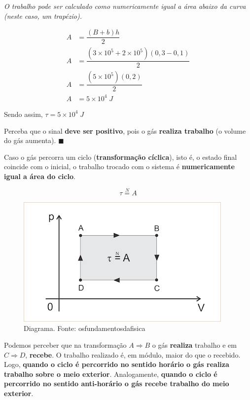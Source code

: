 \documentclass[12pt]{article}
\newenvironment{resposta*}
{\bf Resposta:\\ }
{}
\begin{document}
\begin{resposta*}
{\it O trabalho pode ser calculado como numericamente igual a área abaixo da curva (neste caso, um trapézio).

\begin{align*}
    A &= \dfrac{(B+b)h}{2}\\
    A &= \dfrac{(3\times 10^{5}+2\times 10^{5})(0,3-0,1)}{2}\\
    A &= \dfrac{(5\times 10^{5})(0,2)}{2}\\
    A &= 5\times 10^{4}\;J
\end{align*}

Sendo assim, $\boxed{\tau = 5\times 10^{4}\;J}$

Perceba que o sinal \textbf{deve ser positivo}, pois o gás \textbf{realiza trabalho} (o volume do gás aumenta). $\blacksquare$}
\end{resposta*}

Caso o gás percorra um ciclo (\textbf{transformação cíclica}), isto é, o estado final coincide com o inicial, o trabalho trocado com o sistema é \textbf{numericamente igual a área do ciclo}.


\begin{equation*}
    \tau \stackrel{N}{=} A
\end{equation*}


\begin{figure}[h]{}
\centering\includegraphics[width=2.5truein]{img5.png}
\caption{Diagrama. Fonte: osfundamentosdafisica}
\centering
\end{figure}

Podemos perceber que na transformação \textbf{$A\Rightarrow B$} o gás \textbf{realiza} trabalho e em \textbf{$C\Rightarrow D$}, \textbf{recebe}. O trabalho realizado é, em módulo, maior do que o recebido. Logo, \textbf{quando o ciclo é percorrido no sentido horário o gás realiza trabalho sobre o meio exterior}. Analogamente, \textbf{quando o ciclo é percorrido no sentido anti-horário o gás recebe trabalho do meio exterior}.
\end{document}
